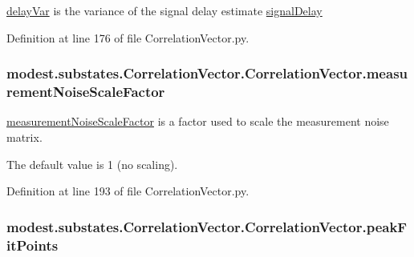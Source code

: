 \hyperlink{classmodest_1_1substates_1_1CorrelationVector_1_1CorrelationVector_af26efaaeaeff4ef313b8f1654559787a}{delay\+Var} is the variance of the signal delay estimate \hyperlink{classmodest_1_1substates_1_1CorrelationVector_1_1CorrelationVector_ab1dbedfba4787748c5778359b78dc3cf}{signal\+Delay} 



Definition at line 176 of file Correlation\+Vector.\+py.

\subsubsection[{\texorpdfstring{measurement\+Noise\+Scale\+Factor}{measurementNoiseScaleFactor}}]{\setlength{\rightskip}{0pt plus 5cm}modest.\+substates.\+Correlation\+Vector.\+Correlation\+Vector.\+measurement\+Noise\+Scale\+Factor}\hypertarget{classmodest_1_1substates_1_1CorrelationVector_1_1CorrelationVector_a739a70da1ddef21b637a546619e31895}{}\label{classmodest_1_1substates_1_1CorrelationVector_1_1CorrelationVector_a739a70da1ddef21b637a546619e31895}


\hyperlink{classmodest_1_1substates_1_1CorrelationVector_1_1CorrelationVector_a739a70da1ddef21b637a546619e31895}{measurement\+Noise\+Scale\+Factor} is a factor used to scale the measurement noise matrix. 

The default value is 1 (no scaling). 

Definition at line 193 of file Correlation\+Vector.\+py.

\subsubsection[{\texorpdfstring{peak\+Fit\+Points}{peakFitPoints}}]{\setlength{\rightskip}{0pt plus 5cm}modest.\+substates.\+Correlation\+Vector.\+Correlation\+Vector.\+peak\+Fit\+Points}\hypertarget{classmodest_1_1substates_1_1CorrelationVector_1_1CorrelationVector_a3a6c344370944a5e84a064cd26d1db81}{}\label{classmodest_1_1substates_1_1CorrelationVector_1_1CorrelationVector_a3a6c344370944a5e84a064cd26d1db81}


